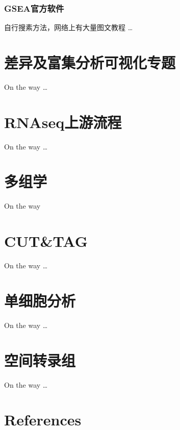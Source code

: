\documentclass[
]{book}
\begin{document}
\subsection{GSEA官方软件}\label{gseaux5b98ux65b9ux8f6fux4ef6}

自行搜素方法，网络上有大量图文教程 \ldots{}

\chapter{差异及富集分析可视化专题}\label{visual}

On the way \ldots{}

\chapter{RNAseq上游流程}\label{rnaseq-rsubread}

On the way \ldots{}

\chapter{多组学}\label{multi-omics}

On the way

\chapter{CUT\&TAG}\label{cuttag}

On the way \ldots{}

\chapter{单细胞分析}\label{scRNA}

On the way \ldots{}

\chapter{空间转录组}\label{spatial}

On the way \ldots{}

\chapter*{References}\label{references}

  
\end{document}

